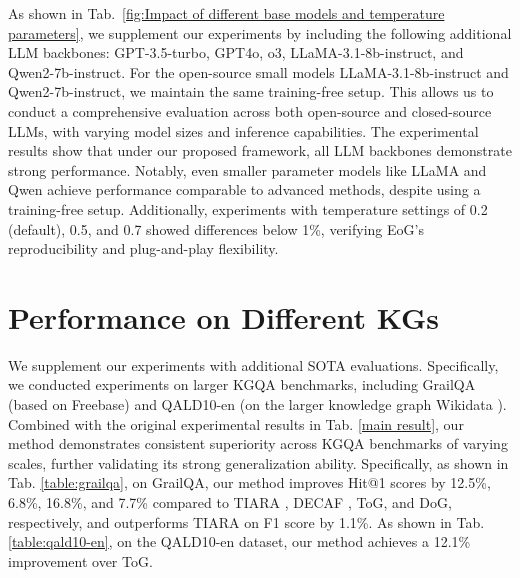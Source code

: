 \documentclass[11pt]{article}
\begin{document}
As shown in Tab.~\ref{fig:Impact of different base models and temperature parameters}, we supplement our experiments by including the following additional LLM backbones: GPT-3.5-turbo, GPT4o, o3, LLaMA-3.1-8b-instruct, and Qwen2-7b-instruct. For the open-source small models LLaMA-3.1-8b-instruct and Qwen2-7b-instruct, we maintain the same training-free setup. This allows us to conduct a comprehensive evaluation across both open-source and closed-source LLMs, with varying model sizes and inference capabilities. The experimental results show that under our proposed framework, all LLM backbones demonstrate strong performance. Notably, even smaller parameter models like LLaMA and Qwen achieve performance comparable to advanced methods, despite using a training-free setup. Additionally, experiments with temperature settings of 0.2 (default), 0.5, and 0.7 showed differences below 1\%, verifying EoG's reproducibility and plug-and-play flexibility.



\section{Performance on Different KGs}

We supplement our experiments with additional SOTA evaluations. Specifically, we conducted experiments on larger KGQA benchmarks, including GrailQA \cite{10.1145/3442381.3449992} (based on Freebase) and QALD10-en \cite{perevalov2022qald9plusmultilingualdatasetquestion} (on the larger knowledge graph Wikidata \cite{10.1145/2629489}). Combined with the original experimental results in Tab. \ref{main result}, our method demonstrates consistent superiority across KGQA benchmarks of varying scales, further validating its strong generalization ability. Specifically, as shown in Tab. \ref{table:grailqa}, on GrailQA, our method improves Hit@1 scores by 12.5\%, 6.8\%, 16.8\%, and 7.7\% compared to TIARA \cite{shu-etal-2022-tiara}, DECAF \cite{yu2023decafjointdecodinganswers}, ToG, and DoG, respectively, and outperforms TIARA on F1 score by 1.1\%. As shown in Tab. \ref{table:qald10-en}, on the QALD10-en dataset, our method achieves a 12.1\% improvement over ToG.
\end{document}
